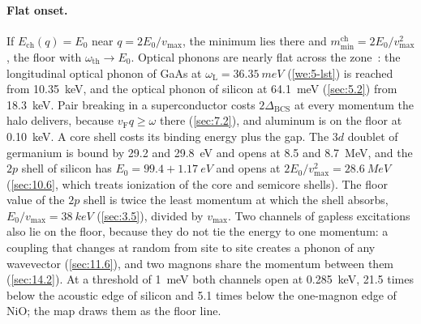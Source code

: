 \paragraph{Flat onset.} If $E_{\mathrm{ch}}(q) = E_0$ near $q = 2E_0/v_{\mathrm{max}}$, the minimum lies there and $m_{\mathrm{min}}^{\mathrm{ch}} = 2E_0/v_{\mathrm{max}}^2$, the floor with $\omega_{\mathrm{th}} \to E_0$. Optical phonons are nearly flat across the zone~\cite[Sect.~IV\,B, Eq.~(94)]{kahn2022searches}: the longitudinal optical phonon of GaAs at $\omega_{\mathrm{L}} = \SI{36.35}{meV}$ (\cref{we:5-lst}) is reached from \SI{10.35}{keV}, and the optical phonon of silicon at \SI{64.1}{meV} (\cref{sec:5.2}) from \SI{18.3}{keV}. Pair breaking in a superconductor costs $2\Delta_{\mathrm{BCS}}$ at every momentum the halo delivers, because $v_{\mathrm{F}}q \ge \omega$ there (\cref{sec:7.2}), and aluminum is on the floor at \SI{0.10}{keV}. A core shell costs its binding energy plus the gap. The $3d$ doublet of germanium is bound by 29.2 and \SI{29.8}{eV} and opens at 8.5 and \SI{8.7}{MeV}, and the $2p$ shell of silicon has $E_0 = 99.4 + \SI{1.17}{eV}$ and opens at $2E_0/v_{\mathrm{max}}^2 = \SI{28.6}{MeV}$ (\cref{sec:10.6}, which treats ionization of the core and semicore shells). The floor value of the $2p$ shell is twice the least momentum at which the shell absorbs, $E_0/v_{\mathrm{max}} = \SI{38}{keV}$ (\cref{sec:3.5}), divided by $v_{\mathrm{max}}$. Two channels of gapless excitations also lie on the floor, because they do not tie the energy to one momentum: a coupling that changes at random from site to site creates a phonon of any wavevector (\cref{sec:11.6}), and two magnons share the momentum between them (\cref{sec:14.2}). At a threshold of \SI{1}{meV} both channels open at \SI{0.285}{keV}, 21.5 times below the acoustic edge of silicon and 5.1 times below the one-magnon edge of NiO; the map draws them as the floor line.

